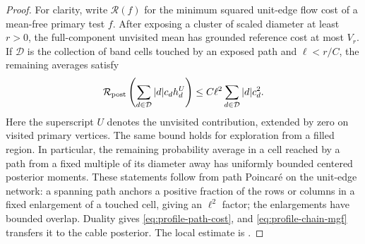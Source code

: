 \begin{proof}
For clarity, write \(\mathcal R(f)\) for the minimum squared
unit-edge flow cost of a mean-free primary test \(f\).  After exposing
a cluster of scaled diameter at least \(r>0\), the full-component
unvisited mean has grounded reference cost at most \(V_r\).  If
\(\mathcal D\) is the collection of band cells touched by an exposed
path and \(\ell<r/C\), the remaining averages satisfy
\begin{equation}\label{eq:profile-path-cost}
 \mathcal R_{\rm post}
       \left(\sum_{d\in\mathcal D}|d|c_dh_d^U\right)
          \le C\ell^2\sum_{d\in\mathcal D}|d|c_d^2.
\end{equation}
Here the superscript \(U\) denotes the unvisited contribution,
extended by zero on visited primary vertices.  The same bound holds
for exploration from a filled region.  In particular, the remaining
probability average in a cell reached by a path from a fixed multiple
of its diameter away has uniformly bounded centered posterior moments.
These statements follow from path Poincar\'e on the unit-edge network:
a spanning path anchors a positive fraction of the rows or columns
in a fixed enlargement of a touched cell, giving an \(\ell^2\)
factor; the enlargements have bounded overlap.  Duality gives
\eqref{eq:profile-path-cost}, and \eqref{eq:profile-chain-mgf}
transfers it to the cable posterior.
The local estimate is \cite[Equation~(3.6), Lemma~3.4]{X}.


\end{proof}
